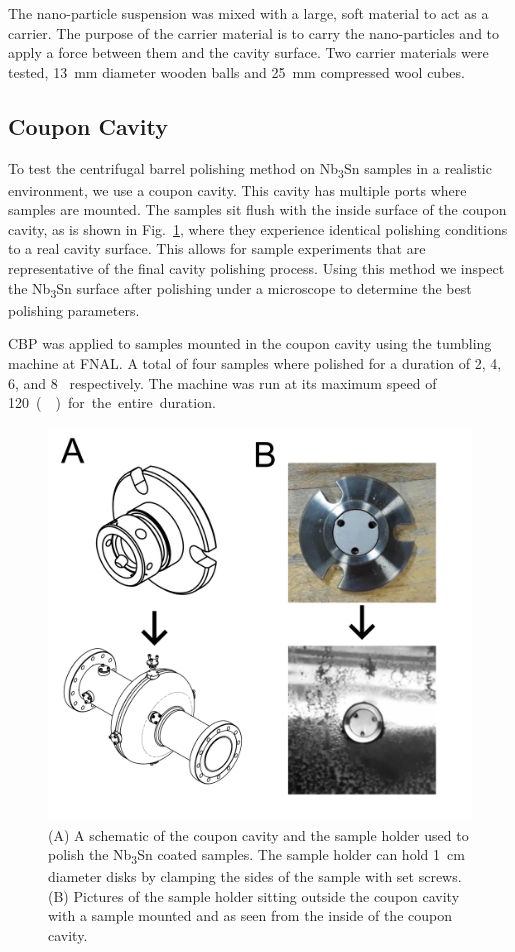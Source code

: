 \documentclass[reprint,amsmath,amssymb,aps]{revtex4-2}%
\begin{document}
The nano-particle suspension was mixed with a large, soft material to act as a carrier. The purpose of the carrier material is to carry the nano-particles and to apply a force between them and the cavity surface. Two carrier materials were tested, 13~mm diameter wooden balls and 25~mm compressed wool cubes.

%
\subsection{Coupon Cavity}%
\label{subsec:couponcavity}%
To test the centrifugal barrel polishing method on Nb\textsubscript{3}Sn samples in a realistic environment, we use a coupon cavity\cite{higuchi1996investigation}. This cavity has multiple ports where samples are mounted. The samples sit flush with the inside surface of the coupon cavity, as is shown in Fig.~\ref{fig:couponcavity}, where they experience identical polishing conditions to a real cavity surface. This allows for sample experiments that are representative of the final cavity polishing process. Using this method we inspect the Nb\textsubscript{3}Sn surface after polishing under a microscope to determine the best polishing parameters.

CBP was applied to samples mounted in the coupon cavity using the tumbling machine at FNAL. A total of four samples where polished for a duration of 2, 4, 6, and 8~\si{\hours} respectively. The machine was run at its maximum speed of 120~\si(\RPM) for the entire duration.
%


\begin{figure}[htb]%
\centering%
\includegraphics[width=\columnwidth]{../doc/figs/Coupon_Cavity.png}%
\caption{(A) A schematic of the coupon cavity and the sample holder used to polish the Nb\textsubscript{3}Sn coated samples. The sample holder can hold 1~cm diameter disks by clamping the sides of the sample with set screws. (B) Pictures of the sample holder sitting outside the coupon cavity with a sample mounted and as seen from the inside of the coupon cavity.}%
\label{fig:couponcavity}%
\end{figure}
\end{document}
